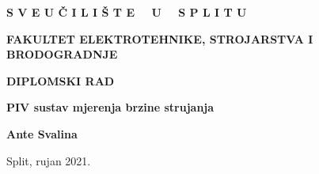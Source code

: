 \documentclass[12pt, oneside, onecolumn]{book}
\begin{document}
	\pagestyle{fancy}
	\fancyhead{}
	\fancyfoot{}
	\fancyfoot[R]{\thepage}
	
	\linespread{1.6}
	\setlength{\parindent}{0em}
	\setlength{\parskip}{0.8em}
	
	\addtolength{\abovedisplayskip}{-2mm}
	\addtolength{\abovedisplayshortskip}{-2mm}
	\addtolength{\belowdisplayskip}{-2mm}
	\addtolength{\belowdisplayshortskip}{-2mm}
	\setlength{\abovecaptionskip}{1mm}

\begin{titlepage}
	\begin{center}	
		{\fontsize{18}{20}\textbf{S V E U Č I L I Š T E \ \  U \ \  S P L I T U}}
		\par
		\vspace{1cm}
		{\fontsize{18}{20}\textbf{FAKULTET ELEKTROTEHNIKE, STROJARSTVA I BRODOGRADNJE}}
		\vspace{6cm}
		\par
		{\fontsize{18}{20}\bfseries{DIPLOMSKI RAD}}
		\par
		\vspace{3cm}
		{\fontsize{22}{26}\bfseries{PIV sustav mjerenja brzine strujanja}}
		\vspace{1cm}
		\par
		{\fontsize{18}{20}\textbf{Ante Svalina}}
		\vspace{8cm}
		\par
		{\Large Split, rujan 2021.}
	\end{center}
\end{titlepage}







\frontmatter
\tableofcontents





\mainmatter








\end{document}
